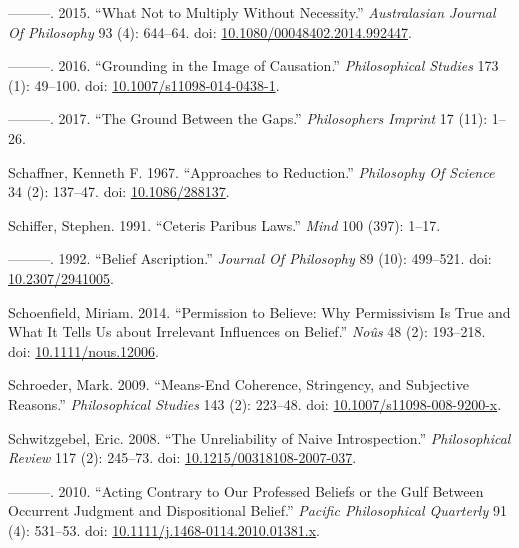 \documentclass[
  10pt,
  letterpaper,
  DIV=11,
  numbers=noendperiod,
  twoside]{scrartcl}
\newlength{\cslhangindent}
\newenvironment{CSLReferences}[2] %
 {\begin{list}{}{%
  \setlength{\itemindent}{0pt}
  \setlength{\leftmargin}{0pt}
  \setlength{\parsep}{0pt}
  \ifodd #1
   \setlength{\leftmargin}{\cslhangindent}
   \setlength{\itemindent}{-1\cslhangindent}
  \fi
  \setlength{\itemsep}{#2\baselineskip}}}
 {\end{list}}
\begin{document}
\begin{CSLReferences}{1}{0}
---------. 2015. {``What Not to Multiply Without Necessity.''}
\emph{Australasian Journal Of Philosophy} 93 (4): 644--64. doi:
\href{https://doi.org/10.1080/00048402.2014.992447}{10.1080/00048402.2014.992447}.

---------. 2016. {``Grounding in the Image of Causation.''}
\emph{Philosophical Studies} 173 (1): 49--100. doi:
\href{https://doi.org/10.1007/s11098-014-0438-1}{10.1007/s11098-014-0438-1}.

---------. 2017. {``The Ground Between the Gaps.''} \emph{Philosophers
Imprint} 17 (11): 1--26.

Schaffner, Kenneth F. 1967. {``Approaches to Reduction.''}
\emph{Philosophy Of Science} 34 (2): 137--47. doi:
\href{https://doi.org/10.1086/288137}{10.1086/288137}.

Schiffer, Stephen. 1991. {``Ceteris Paribus Laws.''} \emph{Mind} 100
(397): 1--17.

---------. 1992. {``Belief Ascription.''} \emph{Journal Of Philosophy}
89 (10): 499--521. doi:
\href{https://doi.org/10.2307/2941005}{10.2307/2941005}.

Schoenfield, Miriam. 2014. {``Permission to Believe: Why Permissivism Is
True and What It Tells Us about Irrelevant Influences on Belief.''}
\emph{Noûs} 48 (2): 193--218. doi:
\href{https://doi.org/10.1111/nous.12006}{10.1111/nous.12006}.

Schroeder, Mark. 2009. {``Means-End Coherence, Stringency, and
Subjective Reasons.''} \emph{Philosophical Studies} 143 (2): 223--48.
doi:
\href{https://doi.org/10.1007/s11098-008-9200-x}{10.1007/s11098-008-9200-x}.

Schwitzgebel, Eric. 2008. {``The Unreliability of Naive
Introspection.''} \emph{Philosophical Review} 117 (2): 245--73. doi:
\href{https://doi.org/10.1215/00318108-2007-037}{10.1215/00318108-2007-037}.

---------. 2010. {``Acting Contrary to Our Professed Beliefs or the Gulf
Between Occurrent Judgment and Dispositional Belief.''} \emph{Pacific
Philosophical Quarterly} 91 (4): 531--53. doi:
\href{https://doi.org/10.1111/j.1468-0114.2010.01381.x}{10.1111/j.1468-0114.2010.01381.x}.


\end{CSLReferences}
\end{document}
